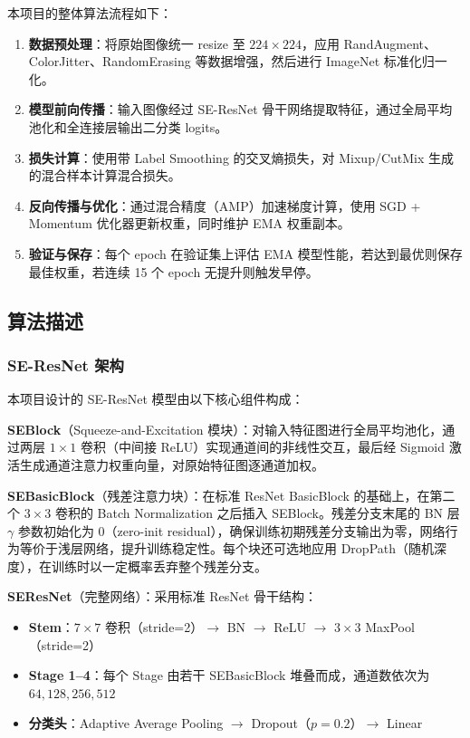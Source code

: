 \documentclass[12pt,a4paper]{ctexart}
\begin{document}
本项目的整体算法流程如下：
\begin{enumerate}
    \item \textbf{数据预处理}：将原始图像统一 resize 至 $224\times224$，应用 RandAugment、ColorJitter、RandomErasing 等数据增强，然后进行 ImageNet 标准化归一化。
    \item \textbf{模型前向传播}：输入图像经过 SE-ResNet 骨干网络提取特征，通过全局平均池化和全连接层输出二分类 logits。
    \item \textbf{损失计算}：使用带 Label Smoothing 的交叉熵损失，对 Mixup/CutMix 生成的混合样本计算混合损失。
    \item \textbf{反向传播与优化}：通过混合精度（AMP）加速梯度计算，使用 SGD + Momentum 优化器更新权重，同时维护 EMA 权重副本。
    \item \textbf{验证与保存}：每个 epoch 在验证集上评估 EMA 模型性能，若达到最优则保存最佳权重，若连续 15 个 epoch 无提升则触发早停。
\end{enumerate}

\subsection{算法描述}

\subsubsection{SE-ResNet 架构}

本项目设计的 SE-ResNet 模型由以下核心组件构成：

\textbf{SEBlock}（Squeeze-and-Excitation 模块）：对输入特征图进行全局平均池化，通过两层 $1\times1$ 卷积（中间接 ReLU）实现通道间的非线性交互，最后经 Sigmoid 激活生成通道注意力权重向量，对原始特征图逐通道加权。

\textbf{SEBasicBlock}（残差注意力块）：在标准 ResNet BasicBlock 的基础上，在第二个 $3\times3$ 卷积的 Batch Normalization 之后插入 SEBlock。残差分支末尾的 BN 层 $\gamma$ 参数初始化为 0（zero-init residual），确保训练初期残差分支输出为零，网络行为等价于浅层网络，提升训练稳定性。每个块还可选地应用 DropPath（随机深度），在训练时以一定概率丢弃整个残差分支。

\textbf{SEResNet}（完整网络）：采用标准 ResNet 骨干结构：
\begin{itemize}
    \item \textbf{Stem}：$7\times7$ 卷积（stride=2）$\rightarrow$ BN $\rightarrow$ ReLU $\rightarrow$ $3\times3$ MaxPool（stride=2）
    \item \textbf{Stage 1--4}：每个 Stage 由若干 SEBasicBlock 堆叠而成，通道数依次为 $64, 128, 256, 512$
    \item \textbf{分类头}：Adaptive Average Pooling $\rightarrow$ Dropout（$p=0.2$）$\rightarrow$ Linear
\end{itemize}
\end{document}
